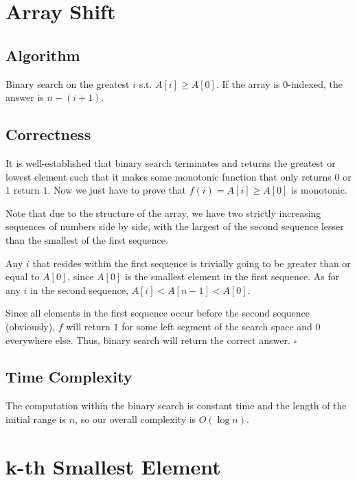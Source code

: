 \documentclass[12pt]{article}
\begin{document}
\section{Array Shift}\label{arrshift}

\subsection{Algorithm}

Binary search on the greatest $i$ s.t. $A[i] \ge A[0]$.
If the array is 0-indexed, the answer is $n-(i+1)$.

\subsection{Correctness}

It is well-established that binary search terminates
and returns the greatest or lowest element such that it makes some
monotonic function that only returns $0$ or $1$ return $1$.
Now we just have to prove that $f(i)=A[i] \ge A[0]$ is monotonic.

Note that due to the structure of the array,
we have two strictly increasing sequences of numbers side by side,
with the largest of the second sequence lesser than the smallest of the first sequence.

Any $i$ that resides within the first sequence is trivially
going to be greater than or equal to $A[0]$, since $A[0]$ is the smallest element
in the first sequence.
As for any $i$ in the second sequence, $A[i]<A[n-1]<A[0]$.

Since all elements in the first sequence occur before the second sequence (obviously),
$f$ will return $1$ for some left segment of the search space and $0$ everywhere else.
Thus, binary search will return the correct answer. $\square$

\subsection{Time Complexity}

The computation within the binary search is constant time and the length of the
initial range is $n$, so our overall complexity is $\boxed{O(\log n)}$.

\pagebreak

\section{k-th Smallest Element}
\end{document}
